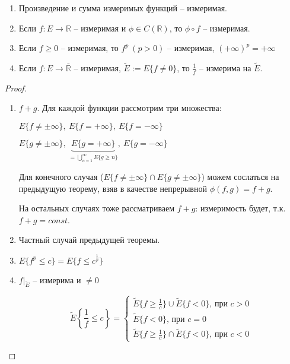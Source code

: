 \begin{theorem}
    \begin{enumerate}
        \item Произведение и сумма измеримых функций -- измеримая.
        \item Если  $f: E \rightarrow \mathbb{R}$ -- измеримая и $\phi \in C(\mathbb{R})$, то $\phi \circ f$ -- измеримая.
        \item Если $f \geq 0$ -- измеримая, то $f^p \ (p>0)$ -- измеримая, $(+\infty)^p = +\infty$
        \item Если $f: E \rightarrow \bar{\mathbb{R}}$ -- измеримая, $\tilde{E} := E \{f \not = 0\}$, то $\frac{1}{f}$ -- измерима на $\tilde{E}$.
    \end{enumerate}
\end{theorem}
\begin{proof}
    \begin{enumerate}
        \item {
            $f + g.$ Для каждой функции рассмотрим три множества:

            $E \{ f \not = \pm \infty \}, \ E \{ f = + \infty \}, \ E \{ f = -\infty \}$

            $E \{ g \not = \pm \infty \}, \ \underbrace{E \{ g = + \infty \}}_{= \bigcup_{n=1}^{\infty} E \{ g \geq n \}}, \ E \{ g = -\infty \}$


            Для конечного случая ($E\{f \neq \pm \infty\} \cap E\{g \neq \pm \infty\}$) можем сослаться на предыдущую теорему, взяв в качестве непрерывной $\phi(f, g) = f + g$.

            На остальных случаях тоже рассматриваем $f + g$: измеримость будет, т.к. $f + g = const$.
        }
        \item {
            Частный случай предыдущей теоремы.
        }
        \item {
            $E \{f^p \leq c\} = E \{ f \leq c^{\frac{1}{p}} \}$
        }
        \item {
            $f|_{\tilde{E}}$ -- измерима и $\not = 0$
            

            \begin{equation}
                \tilde{E}\left\{ \frac{1}{f} \leq c \right\} = 
                \begin{cases}
                    \tilde{E} \{ f \geq \frac{1}{c} \} \cup \tilde{E} \{ f < 0 \} \text{, при $c > 0$} \\
                    \tilde{E}\{ f < 0 \} \text{, при $c = 0$} \\
                    \tilde{E} \{ f \geq \frac{1}{c} \} \cap \tilde{E} \{ f < 0 \} \text{, при $c < 0$}
                \end{cases}                
            \end{equation}
        }
    \end{enumerate}
\end{proof}
